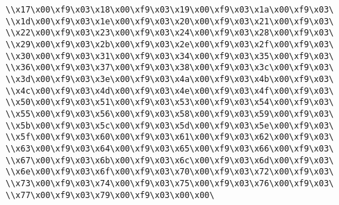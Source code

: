 \verb|\\x17\x00\xf9\x03\x18\x00\xf9\x03\x19\x00\xf9\x03\x1a\x00\xf9\x03\|\newline
\verb|\\x1d\x00\xf9\x03\x1e\x00\xf9\x03\x20\x00\xf9\x03\x21\x00\xf9\x03\|\newline
\verb|\\x22\x00\xf9\x03\x23\x00\xf9\x03\x24\x00\xf9\x03\x28\x00\xf9\x03\|\newline
\verb|\\x29\x00\xf9\x03\x2b\x00\xf9\x03\x2e\x00\xf9\x03\x2f\x00\xf9\x03\|\newline
\verb|\\x30\x00\xf9\x03\x31\x00\xf9\x03\x34\x00\xf9\x03\x35\x00\xf9\x03\|\newline
\verb|\\x36\x00\xf9\x03\x37\x00\xf9\x03\x38\x00\xf9\x03\x3c\x00\xf9\x03\|\newline
\verb|\\x3d\x00\xf9\x03\x3e\x00\xf9\x03\x4a\x00\xf9\x03\x4b\x00\xf9\x03\|\newline
\verb|\\x4c\x00\xf9\x03\x4d\x00\xf9\x03\x4e\x00\xf9\x03\x4f\x00\xf9\x03\|\newline
\verb|\\x50\x00\xf9\x03\x51\x00\xf9\x03\x53\x00\xf9\x03\x54\x00\xf9\x03\|\newline
\verb|\\x55\x00\xf9\x03\x56\x00\xf9\x03\x58\x00\xf9\x03\x59\x00\xf9\x03\|\newline
\verb|\\x5b\x00\xf9\x03\x5c\x00\xf9\x03\x5d\x00\xf9\x03\x5e\x00\xf9\x03\|\newline
\verb|\\x5f\x00\xf9\x03\x60\x00\xf9\x03\x61\x00\xf9\x03\x62\x00\xf9\x03\|\newline
\verb|\\x63\x00\xf9\x03\x64\x00\xf9\x03\x65\x00\xf9\x03\x66\x00\xf9\x03\|\newline
\verb|\\x67\x00\xf9\x03\x6b\x00\xf9\x03\x6c\x00\xf9\x03\x6d\x00\xf9\x03\|\newline
\verb|\\x6e\x00\xf9\x03\x6f\x00\xf9\x03\x70\x00\xf9\x03\x72\x00\xf9\x03\|\newline
\verb|\\x73\x00\xf9\x03\x74\x00\xf9\x03\x75\x00\xf9\x03\x76\x00\xf9\x03\|\newline
\verb|\\x77\x00\xf9\x03\x79\x00\xf9\x03\x00\x00\|\newline

